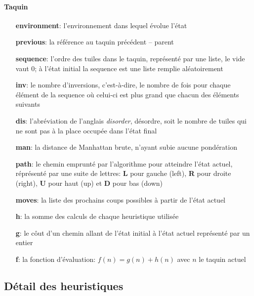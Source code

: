 \documentclass[10pt,a4paper]{report}
\begin{document}
\paragraph{Taquin}
\begin{itemize}
\item [{\ttfamily\bfseries environment}:] {l'environnement dans lequel évolue l’état}
\item [{\ttfamily\bfseries previous}:] {la référence au taquin précédent – parent}
\item [{\ttfamily\bfseries sequence}:] {l'ordre des tuiles dans le taquin, représenté par une liste, le vide vaut ${0}$; à l'état initial la {\ttfamily sequence} est une liste remplie aléatoirement}
\item [{\ttfamily\bfseries inv}:] {le nombre d'inversions,  c’est-à-dire, le nombre de fois pour chaque élément de la {\ttfamily sequence}  où celui-ci est plus grand que chacun des éléments suivants}
\item [{\ttfamily\bfseries dis}:] {l'abréviation de l'anglais {\em disorder}, désordre, soit le nombre de tuiles qui ne sont pas à la place occupée dans l'état final}
\item [{\ttfamily\bfseries man}:] {la distance de Manhattan brute, n'ayant subie aucune pondération}
\item [{\ttfamily\bfseries path}:] {le chemin emprunté par l'algorithme pour atteindre l'état actuel, réprésenté par une suite de lettres: {\ttfamily\bfseries L} pour gauche (left), {\ttfamily\bfseries R} pour droite (right), {\ttfamily\bfseries U} pour haut (up) et {\ttfamily\bfseries D} pour bas (down)}
\item [{\ttfamily\bfseries moves}:] {la liste des prochains coups possibles à partir de l'état actuel}
\item [{\ttfamily\bfseries h}:] {la somme des calculs de chaque heuristique utilisée}
\item [{\ttfamily\bfseries g}:] {le côut d'un chemin allant de l'état initial à l'état actuel représenté par un entier}
\item [{\ttfamily\bfseries f}:] {la fonction d'évaluation: ${f(n) = g(n) + h(n)}$ avec ${n}$ le taquin actuel}
\end{itemize}
\subsection{Détail des heuristiques}
\end{document}
